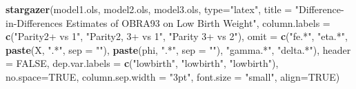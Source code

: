 \documentclass[
]{article}
\newenvironment{Shaded}{\begin{snugshade}}{\end{snugshade}}
\newcommand{\DataTypeTok}[1]{\textcolor[rgb]{0.13,0.29,0.53}{#1}}
\newcommand{\KeywordTok}[1]{\textcolor[rgb]{0.13,0.29,0.53}{\textbf{#1}}}
\newcommand{\NormalTok}[1]{#1}
\newcommand{\OtherTok}[1]{\textcolor[rgb]{0.56,0.35,0.01}{#1}}
\newcommand{\StringTok}[1]{\textcolor[rgb]{0.31,0.60,0.02}{#1}}
\begin{document}
\begin{Shaded}
\begin{Highlighting}[]
\KeywordTok{stargazer}\NormalTok{(model1.ols, model2.ols, model3.ols,}
          \DataTypeTok{type=}\StringTok{"latex"}\NormalTok{, }\DataTypeTok{title =} \StringTok{"Difference-in-Differences Estimates of OBRA93 on Low Birth Weight"}\NormalTok{,}
          \DataTypeTok{column.labels =} \KeywordTok{c}\NormalTok{(}\StringTok{"Parity2+ vs 1"}\NormalTok{, }\StringTok{"Parity2, 3+ vs 1"}\NormalTok{, }\StringTok{"Parity 3+ vs 2"}\NormalTok{), }
          \DataTypeTok{omit =} \KeywordTok{c}\NormalTok{(}\StringTok{"fe.*"}\NormalTok{, }\StringTok{"eta.*"}\NormalTok{, }\KeywordTok{paste}\NormalTok{(X, }\StringTok{".*"}\NormalTok{, }\DataTypeTok{sep =} \StringTok{""}\NormalTok{), }
                   \KeywordTok{paste}\NormalTok{(phi, }\StringTok{".*"}\NormalTok{, }\DataTypeTok{sep =} \StringTok{""}\NormalTok{), }\StringTok{"gamma.*"}\NormalTok{, }\StringTok{"delta.*"}\NormalTok{), }
          \DataTypeTok{header =} \OtherTok{FALSE}\NormalTok{, }
          \DataTypeTok{dep.var.labels =} \KeywordTok{c}\NormalTok{(}\StringTok{"lowbirth"}\NormalTok{, }\StringTok{"lowbirth"}\NormalTok{, }\StringTok{"lowbirth"}\NormalTok{),}
          \DataTypeTok{no.space=}\OtherTok{TRUE}\NormalTok{, }\DataTypeTok{column.sep.width =} \StringTok{"3pt"}\NormalTok{, }
          \DataTypeTok{font.size =} \StringTok{"small"}\NormalTok{, }\DataTypeTok{align=}\OtherTok{TRUE}\NormalTok{)}
\end{Highlighting}
\end{Shaded}
\end{document}
